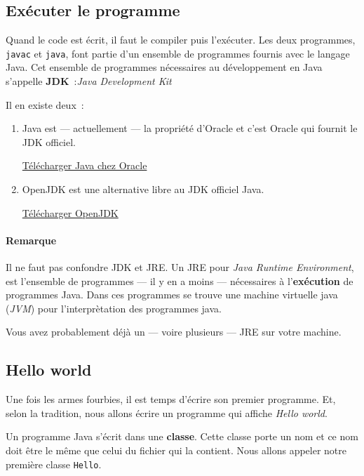 \subsection{Exécuter le programme}

Quand le code est écrit, il faut le compiler puis l'exécuter. Les deux
programmes, \texttt{javac} et \texttt{java}, font partie d'un ensemble de
programmes fournis avec le langage Java. Cet ensemble de programmes nécessaires
au développement en Java s'appelle \textbf{JDK}~:\textit{Java Development Kit}

Il en existe deux~:

\begin{enumerate}
	
	\item Java est — actuellement — la propriété d'Oracle et c'est Oracle qui
		fournit le JDK officiel. 

		\href{http://www.oracle.com/technetwork/java/javase/downloads}
		{Télécharger Java chez Oracle}

	\item OpenJDK est une alternative libre au JDK officiel Java.

		\href{http://openjdk.java.net/}{Télécharger OpenJDK}

\end{enumerate}


\paragraph {Remarque} Il ne faut pas confondre JDK et JRE. Un JRE
pour \textit{Java Runtime Environment}, est l'ensemble de programmes — il y en
a moins — nécessaires à l'\textbf{exécution} de programmes Java. Dans ces
programmes se trouve une machine virtuelle java (\textit{JVM}) pour
l'interprètation des programmes java. 

Vous avez probablement déjà un — voire plusieurs — JRE sur votre machine. 


\subsection{Hello world}
\label{helloworld}

Une fois les armes fourbies, il est temps d'écrire son premier programme. Et,
selon la tradition, nous allons écrire un programme qui affiche \textit{Hello
world}.

Un programme Java s'écrit dans une \textbf{classe}. Cette classe porte un nom et
ce nom doit être le même que celui du fichier qui la contient. Nous allons
appeler notre première classe \texttt{Hello}. 


